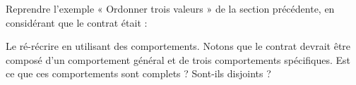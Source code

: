 

Reprendre l'exemple « Ordonner trois valeurs » de la section
précédente, en considérant que le contrat était :




Le ré-récrire en utilisant des comportements. Notons que le contrat
devrait être composé d'un comportement général et de trois
comportements spécifiques. Est ce que ces comportements sont complets ?
Sont-ils disjoints ?
